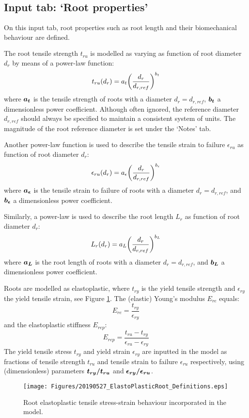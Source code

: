 \documentclass[a4 paper, 11  pt]{article}
\begin{document}
\subsection{Input tab: `Root properties'}
\label{sec:inputrootproperties}

On this input tab, root properties such as root length and their biomechanical behaviour are defined.

The root tensile strength $t_{ru}$ is modelled as varying as function of root diameter $d_r$ by means of a power-law function:
\begin{equation}
	t_{ru}(d_r) = a_t \qty(\frac{d_r}{d_{r,ref}})^{b_t}
	\label{eq:tru}
\end{equation}
where $\vb*{a_t}$ is the tensile strength of roots with a diameter $d_r=d_{r,ref}$, $\vb*{b_t}$ a dimensionless power coefficient. Although often ignored, the reference diameter $d_{r,ref}$ should always be specified to maintain a consistent system of units. The magnitude of the root reference diameter is set under the `Notes' tab.

Another power-law function is used to describe the tensile strain to failure $\epsilon_{ru}$ as function of root diameter $d_r$:
\begin{equation}
	\epsilon_{ru}(d_r) = a_\epsilon \qty(\frac{d_r}{d_{r,ref}})^{b_\epsilon}
	\label{eq:eru}
\end{equation}
where $\vb*{a_\epsilon}$ is the tensile strain to failure of roots with a diameter $d_r=d_{r,ref}$, and $\vb*{b_\epsilon}$ a dimensionless power coefficient.

Similarly, a power-law is used to describe the root length $L_r$ as function of root diameter $d_r$:
\begin{equation}
	L_r(d_r) = a_L \qty(\frac{d_r}{d_{r,ref}})^{b_L}
\end{equation}
where $\vb*{a_L}$ is the root length of roots with a diameter $d_r=d_{r,ref}$, and $\vb*{b_L}$ a dimensionless power coefficient.

Roots are modelled as elastoplastic, where $t_{ry}$ is the yield tensile strength and $\epsilon_{ry}$ the yield tensile strain, see Figure \ref{fig:tensilestressstrain}. The (elastic) Young's modulus $E_{re}$ equals:
\begin{equation}
	E_{re} = \frac{t_{ry}}{\epsilon_{ry}}
	\label{eq:ere}
\end{equation}
and the elastoplastic stiffness $E_{rep}$:
\begin{equation}
	E_{rep} = \frac{t_{ru} - t_{ry}}{\epsilon_{ru} - \epsilon_{ry}} 
	\label{eq:erep}
\end{equation}
The yield tensile stress $t_{ry}$ and yield strain $\epsilon_{ry}$ are inputted in the model as fractions of tensile strength $t_{ru}$ and tensile strain to failure $\epsilon_{ru}$ respectively, using (dimensionless) parameters $\vb*{t_{ry}/t_{ru}}$ and $\vb*{\epsilon_{ry}/\epsilon_{ru}}$.
\begin{figure}
	\centering
		\texttt{[image: Figures/20190527\_ElastoPlasticRoot\_Definitions.eps]}
	\caption{Root elastoplastic tensile stress-strain behaviour incorporated in the model.}
	\label{fig:tensilestressstrain}
\end{figure}
\end{document}
